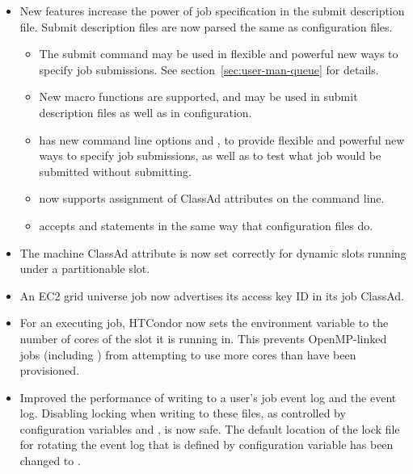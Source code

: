 \begin{itemize}

\item New features increase the power of job specification
in the submit description file. 
Submit description files are now parsed the same as configuration files.

  \begin{itemize}
  \item The  submit command may be used in
flexible and powerful new ways to specify job submissions.
See section~\ref{sec:user-man-queue} for details.

  \item New macro functions are supported, 
and may be used in submit description files as well as in configuration.

  \item {} has new command line options  
and ,
to provide flexible and powerful new ways to specify job submissions,
as well as to test what job would be submitted without submitting.

  \item {} now supports assignment of ClassAd attributes
on the command line.

  \item {} accepts  and 
statements in the same way that configuration files do.

  \end{itemize}

\item The machine ClassAd attribute  is now set correctly
for dynamic slots running under a partitionable slot.

\item An EC2 grid universe job now advertises its access key ID in 
its job ClassAd.

\item For an executing job, HTCondor now sets the environment variable 
 to the number of cores of the slot it is running in.
This prevents OpenMP-linked jobs (including ) 
from attempting to use more cores than have been provisioned.

\item Improved the performance of writing to a user's job event log 
and the event log.
Disabling locking when writing to these files,
as controlled by configuration variables 
and , is now safe.
The default location of the lock file for rotating the event log
that is defined by configuration variable
 has been changed to
.


\end{itemize}
